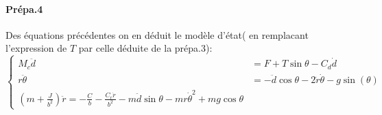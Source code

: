 \documentclass[10pt,a4paper,notitlepage]{article}
\begin{document}
\paragraph{Prépa.4}
Des équations précédentes on en déduit le modèle d'état( en remplacant l'expression de $T$ par celle déduite de la prépa.3):
\begin{equation}
  \begin{cases}
    M_c\ddot{d} &= F +T \sin\theta-C_d\dot{d}\\
    r\ddot{\theta} &= -\ddot{d}\cos\theta-2\dot{r}\dot{\theta}-g\sin(\theta)\\
    (m+\frac{J}{b^2})\ddot{r} = -\frac{C}{b}-\frac{C_r\dot{r}}{b^2}-m\ddot{d}\sin\theta-mr\dot{\theta}^2+mg\cos{\theta}
  \end{cases}
\end{equation}
\end{document}
